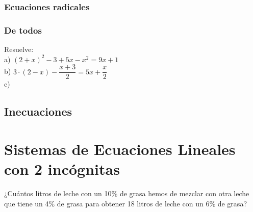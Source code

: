 \subsubsection{Ecuaciones radicales}

\begin{ejer}

\end{ejer}

\begin{ejer}

\end{ejer}

\subsubsection{De todos}

\begin{ejer}
Resuelve: \\
a) $(2+x)^2-3+5x-x^2=9x+1$ \\
b) $3\cdot (2-x)-\dfrac{x+3}{2}=5x+\dfrac{x}{2}$ \\
c) 
\end{ejer}

\subsection{Inecuaciones}

\begin{ejer}

\end{ejer}

\section{Sistemas de Ecuaciones Lineales con 2 incógnitas}

\begin{ejer}
¿Cuántos litros de leche con un 10\% de grasa hemos de mezclar con otra leche que tiene un 4\% de grasa para obtener 18 litros de leche con un 6\% de grasa?
\end{ejer}




